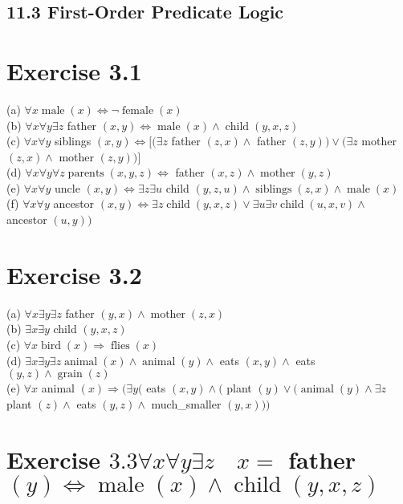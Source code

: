 \documentclass[10pt]{article}
\begin{document}
\subsection*{11.3 First-Order Predicate Logic}
\section*{Exercise 3.1}
(a) $\forall x \operatorname{male}(x) \Leftrightarrow \neg \operatorname{female}(x)$\\
(b) $\forall x \forall y \exists z$ father $(x, y) \Leftrightarrow \operatorname{male}(x) \wedge \operatorname{child}(y, x, z)$\\
(c) $\forall x \forall y$ siblings $(x, y) \Leftrightarrow[(\exists z$ father $(z, x) \wedge$ father $(z, y)) \vee(\exists z$ mother $(z, x) \wedge$ mother $(z, y))]$\\
(d) $\forall x \forall y \forall z \operatorname{parents}(x, y, z) \Leftrightarrow$ father $(x, z) \wedge \operatorname{mother}(y, z)$\\
(e) $\forall x \forall y$ uncle $(x, y) \Leftrightarrow \exists z \exists u$ child $(y, z, u) \wedge \operatorname{siblings}(z, x) \wedge \operatorname{male}(x)$\\
(f) $\forall x \forall y$ ancestor $(x, y) \Leftrightarrow \exists z \operatorname{child}(y, x, z) \vee \exists u \exists v \operatorname{child}(u, x, v) \wedge$ ancestor $(u, y))$

\section*{Exercise 3.2}
(a) $\forall x \exists y \exists z$ father $(y, x) \wedge \operatorname{mother}(z, x)$\\
(b) $\exists x \exists y$ child $(y, x, z)$\\
(c) $\forall x \operatorname{bird}(x) \Rightarrow \operatorname{flies}(x)$\\
(d) $\exists x \exists y \exists z \operatorname{animal}(x) \wedge \operatorname{animal}(y) \wedge$ eats $(x, y) \wedge$ eats $(y, z) \wedge \operatorname{grain}(z)$\\
(e) $\forall x$ animal $(x) \Rightarrow(\exists y($ eats $(x, y) \wedge($ plant $(y) \vee(\operatorname{animal}(y) \wedge \exists z$ plant $(z) \wedge$ eats $(y, z) \wedge$ much\_smaller $(y, x)))$

\section*{Exercise $3.3 \forall x \forall y \exists z \quad x=$ father $(y) \Leftrightarrow \operatorname{male}(x) \wedge \operatorname{child}(y, x, z)$}
\end{document}
